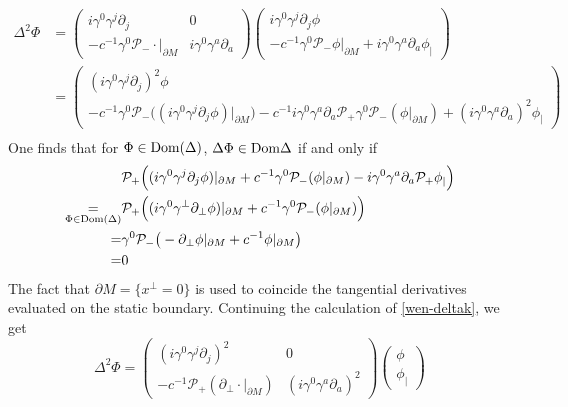 \begin{equation}\label{wen-deltak}
\begin{split}
\Delta^2 \Phi & =  
\begin{pmatrix} i \gamma^0 \gamma^j \partial_j & 0 \\
- c^{-1} \gamma^0 \mathcal{P}_- \cdot \vert_{\partial M} & i \gamma^0 \gamma^a \partial_a \end{pmatrix}
\begin{pmatrix}   i \gamma^0 \gamma^j \partial_j \phi \\
- c^{-1} \gamma^0 \mathcal{P}_- \phi\vert_{\partial M} + i \gamma^0 \gamma^a \partial_a  \phi_| \end{pmatrix} \\
&= 
\begin{pmatrix} (i\gamma^0\gamma^j\partial_j)^2 \phi \\
-c^{-1}\gamma^0\mathcal{P}_- \big( (i\gamma^0\gamma^j\partial_j \phi)\vert_{\partial M}\big)
-c^{-1}i \gamma^0\gamma^a\partial_a \mathcal{P}_+ \gamma^0 \mathcal{P}_-(\phi\vert_{\partial M})
+ (i\gamma^0\gamma^a\partial_a)^2\phi_| \end{pmatrix}
\\
\end{split}
\end{equation}
One finds that for $\Phi \in \mathrm{Dom}(\Delta)$, $\Delta \Phi \in \mathrm{Dom} \Delta$ if and only if
\begin{equation*}
\begin{split}
&\mathcal{P}_+\Big( ( i\gamma^0\gamma^j \partial_j \phi ) \vert_{\partial M} +
 c^{-1}\gamma^0 \mathcal{P}_- ( \phi \vert_{\partial M})
- i \gamma^0 \gamma^a \partial_a \mathcal{P}_+\phi _| \Big) \\
\underset{\Phi\in \mathrm{Dom}(\Delta)}{ = }& 
\mathcal{P}_+\Big( (i\gamma^0\gamma^\bot \partial_\bot\phi)\vert_{\partial M} +
c^{-1}\gamma^0 \mathcal{P}_- ( \phi \vert_{\partial M}) \Big) \\ 
= & 
\gamma^0\mathcal{P}_-\big(- \partial_\bot \phi \vert_{\partial M} + c^{-1} \phi\vert_{\partial M}\big)
\\ = & 0
\end{split}
\end{equation*}
The fact that $\partial M = \{x^\bot = 0\}$ is used to coincide the tangential derivatives evaluated on the static boundary.
Continuing the calculation of \cref{wen-deltak}, we get
\begin{equation}\label{wen-delta2}
\Delta^2 \Phi = \begin{pmatrix} (i \gamma^0 \gamma^j\partial_j)^2 & 0 \\ 
- c^{-1}\mathcal{P}_+( \partial_\bot \cdot\vert_{\partial M} ) & 
(i \gamma^0 \gamma^a \partial_a)^2 \end{pmatrix}
\begin{pmatrix} \phi \\ \phi_| \end{pmatrix}
\end{equation}
